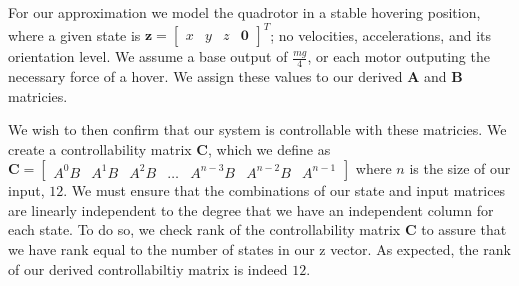 \documentclass{article}
\begin{document}
\begin{multicols}{2}

For our approximation we model the quadrotor in a stable hovering position, where a given state is $\boldsymbol{z}=\begin{bmatrix} x & y & z & \boldsymbol{0}\end{bmatrix}^T$; no velocities, accelerations, and its orientation level. We assume a base output of $\frac{mg}{4}$, or each motor outputing the necessary force of a hover. We assign these values to our derived $\boldsymbol{A}$ and $\boldsymbol{B}$ matricies.

We wish to then confirm that our system is controllable with these matricies. We create a controllability matrix $\boldsymbol{C}$, which we define as $\boldsymbol{C} = \begin{bmatrix} A^0B & A^1B & A^2B & \dots & A^{n-3}B & A^{n-2}B & A^{n-1}\end{bmatrix}$ where $n$ is the size of our input, $12$. We must ensure that the combinations of our state and input matrices are linearly independent to the degree that we have an independent column for each state. To do so, we check rank of the controllability matrix $\boldsymbol{C}$ to assure that we have rank equal to the number of states in our z vector. As expected, the rank of our derived controllabiltiy matrix is indeed $12$.


\end{multicols}
\end{document}
